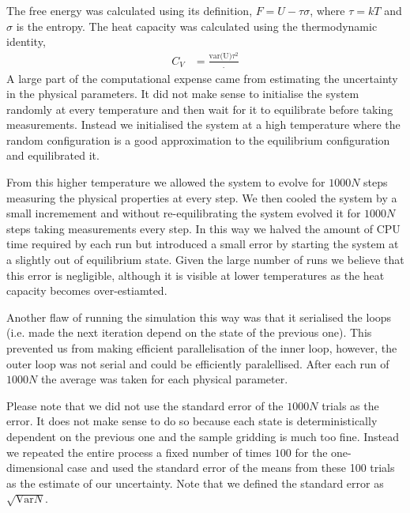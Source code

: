 \documentclass[a4paper]{article}
\begin{document}
\begin{multicols}{2}
        The free energy was calculated using its definition, \(F = U - %
        \tau\sigma\), where \(\tau = kT\) and \(\sigma\) is the entropy. %
        The heat capacity was calculated using the thermodynamic %
        identity,
        \begin{align}
            C_{V} &= \frac{\textrm{var(U)}{\tau^{2}}}.
            \label{eqn:15}
        \end{align}
        A large part of the computational expense came from estimating the %
        uncertainty in the physical parameters. It did not make sense to %
        initialise the system randomly at every temperature and then wait %
        for it to equilibrate before taking measurements. Instead we %
        initialised the system at a high temperature where the random %
        configuration is a good approximation to the equilibrium %
        configuration and equilibrated it. 


        From this higher temperature %
        we allowed the system to evolve for \(1000N\) steps measuring %
        the physical properties at every step. We then cooled the system %
        by a small incremement and without re-equilibrating the system %
        evolved it for \(1000N\) steps taking measurements every step. %
        In this way we halved the amount of CPU time required by each run %
        but introduced a small error by starting the system at a slightly %
        out of equilibrium state. Given the large number of runs we believe %
        that this error is negligible, although it is visible at lower %
        temperatures as the heat capacity becomes over-estiamted. 


        Another flaw of running the simulation this way was that it %
        serialised the loops (i.e. made the next iteration depend on the %
        state of the previous one). This prevented us from making efficient %
        parallelisation of the inner loop, however, the outer loop was %
        not serial and could be efficiently paralellised. After each run %
        of \(1000N\) the average was taken for each physical parameter. 



        Please note that we did not use the standard error of the %
        \(1000N\) trials as the error. It does not make sense to do %
        so because each state is deterministically dependent on the %
        previous one and the sample gridding is much too fine. Instead %
        we repeated the entire process a fixed number of times \(100\) for %
        the one-dimensional case and used the standard error of the means %
        from these 100 trials as the estimate of our uncertainty. Note that %
        we defined the standard error as \(\sqrt{\textrm{Var}{N}}\). %



\end{multicols}
\end{document}
